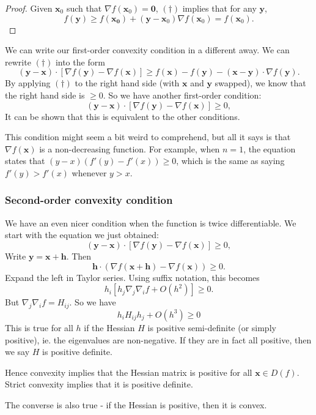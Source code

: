\documentclass[a4paper]{article}
\begin{document}
\begin{proof}
  Given $\mathbf{x}_0$ such that $\nabla f(\mathbf{x}_0) = \mathbf{0}$, $(\dagger)$ implies that for any $\mathbf{y}$,
  \[
    f(\mathbf{y}) \geq f(\mathbf{x_0}) + (\mathbf{y} - \mathbf{x}_0)\nabla f(\mathbf{x}_0) = f(\mathbf{x}_0).
  \]
\end{proof}
We can write our first-order convexity condition in a different away. We can rewrite $(\dagger)$ into the form
\[
  (\mathbf{y} - \mathbf{x}) \cdot [\nabla f(\mathbf{y}) - \nabla f(\mathbf{x})] \geq f(\mathbf{x}) - f(\mathbf{y}) - (\mathbf{x} - \mathbf{y}) \cdot \nabla f(\mathbf{y}).
\]
By applying $(\dagger)$ to the right hand side (with $\mathbf{x}$ and $\mathbf{y}$ swapped), we know that the right hand side is $\geq 0$. So we have another first-order condition:
\[
  (\mathbf{y} - \mathbf{x})\cdot [\nabla f(\mathbf{y}) - \nabla f(\mathbf{x})] \geq 0,
\]
It can be shown that this is equivalent to the other conditions.

This condition might seem a bit weird to comprehend, but all it says is that $\nabla f(\mathbf{x})$ is a non-decreasing function. For example, when $n = 1$, the equation states that $(y - x)(f'(y) - f'(x)) \geq 0$, which is the same as saying $f'(y) > f'(x)$ whenever $y > x$.

\subsubsection{Second-order convexity condition}
We have an even nicer condition when the function is twice differentiable. We start with the equation we just obtained:
\[
  (\mathbf{y} - \mathbf{x})\cdot [\nabla f(\mathbf{y}) - \nabla f(\mathbf{x})] \geq 0,
\]
Write $\mathbf{y} = \mathbf{x} + \mathbf{h}$. Then
\[
  \mathbf{h} \cdot (\nabla f(\mathbf{x} + \mathbf{h}) - \nabla f(\mathbf{x})) \geq 0.
\]
Expand the left in Taylor series. Using suffix notation, this becomes
\[
  h_i [h_j \nabla_j \nabla_i f + O(h^2)] \geq 0.
\]
But $\nabla_j \nabla_i f = H_{ij}$. So we have
\[
  h_i H_{ij}h_j + O(h^3) \geq 0
\]
This is true for all $h$ if the Hessian $H$ is positive semi-definite (or simply positive), ie. the eigenvalues are non-negative. If they are in fact all positive, then we say $H$ is positive definite.

Hence convexity implies that the Hessian matrix is positive for all $\mathbf{x}\in D(f)$. Strict convexity implies that it is positive definite.

The converse is also true - if the Hessian is positive, then it is convex.
\end{document}
